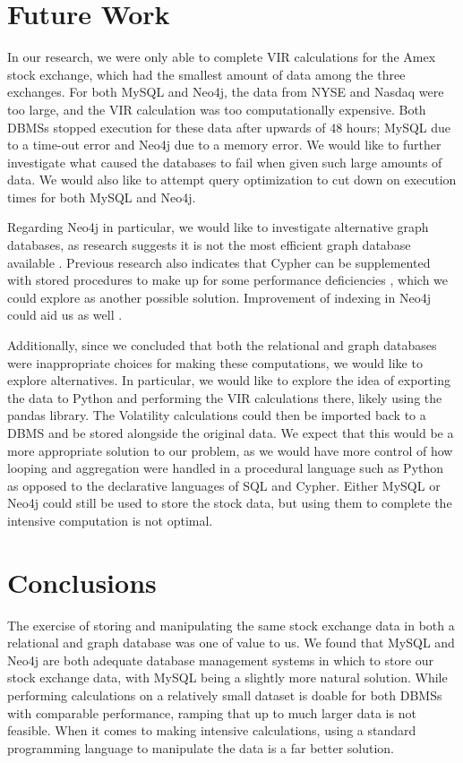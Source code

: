\documentclass{IEEEtran}
\begin{document}
\section{Future Work}

In our research, we were only able to complete VIR calculations for the Amex stock exchange, which had the smallest amount of data among the three exchanges. For both MySQL and Neo4j, the data from NYSE and Nasdaq were too large, and the VIR calculation was too computationally expensive. Both DBMSs stopped execution for these data after upwards of 48 hours; MySQL due to a time-out error and Neo4j due to a memory error. We would like to further investigate what caused the databases to fail when given such large amounts of data. We would also like to attempt query optimization to cut down on execution times for both MySQL and Neo4j.  

Regarding Neo4j in particular, we would like to investigate alternative graph databases, as research suggests it is not the most efficient graph database available \cite{graph-comp}. Previous research also indicates that Cypher can be supplemented with stored procedures to make up for some performance deficiencies \cite{graph-query}, which we could explore as another possible solution. Improvement of indexing in Neo4j could aid us as well \cite{storage-perf}. 

Additionally, since we concluded that both the relational and graph databases were inappropriate choices for making these computations, we would like to explore alternatives. In particular, we would like to explore the idea of exporting the data to Python and performing the VIR calculations there, likely using the pandas library. The Volatility calculations could then be imported back to a DBMS and be stored alongside the original data. We expect that this would be a more appropriate solution to our problem, as we would have more control of how looping and aggregation were handled in a procedural language such as Python as opposed to the declarative languages of SQL and Cypher. Either MySQL or Neo4j could still be used to store the stock data, but using them to complete the intensive computation is not optimal. 

\section{Conclusions}

The exercise of storing and manipulating the same stock exchange data in both a relational and graph database was one of value to us. We found that MySQL and Neo4j are both adequate database management systems in which to store our stock exchange data, with MySQL being a slightly more natural solution. While performing calculations on a relatively small dataset is doable for both DBMSs with comparable performance, ramping that up to much larger data is not feasible. When it comes to making intensive calculations, using a standard programming language to manipulate the data is a far better solution.  



\end{document}
